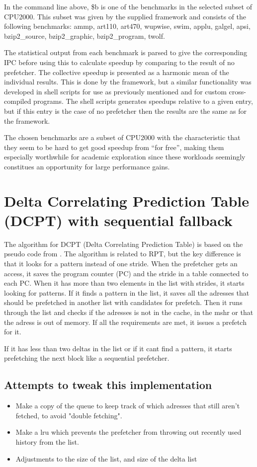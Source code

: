 \documentclass[12pt,journal,compsoc]{IEEEtran}
\begin{document}
In the command line above, \${b} is one of the benchmarks in the selected
subset of CPU2000. This subset was given by the supplied framework and consists
of the following benchmarks: ammp, art110, art470, wupwise, swim, applu,
galgel, apsi, bzip2\_source, bzip2\_graphic, bzip2\_program, twolf.

The statistical output from each benchmark is parsed to give the corresponding
IPC before using this to calculate speedup by comparing to the result
of no prefetcher. The collective speedup is presented as a harmonic mean of
the individual results. This is done by the framework, but a similar
functionality was developed in shell scripts for use as previously mentioned
and for custom cross-compiled programs. The shell scripts generates
speedups relative to a given entry, but if this entry is the case of no
prefetcher then the results are the same as for the framework.

The chosen benchmarks are a subset of CPU2000 with the characteristic that
they seem to be hard to get good speedup from ``for free'', making
them especially worthwhile for academic exploration since these workloads
seemingly constitues an opportunity for large performance gains.

\section{Delta Correlating Prediction Table (DCPT) with sequential fallback}
The algorithm for DCPT (Delta Correlating Prediction Table) is based on the pseudo code from \cite{dcptpaper}.
The algorithm is related to RPT, but the key difference is that it looks for a pattern instead of one stride.
When the prefetcher gets an access, it saves the program counter (PC) and the stride in a table connected to each PC. When it has more than two elements in the list with strides, it starts looking for patterns.
If it finds a pattern in the list, it saves all the adresses that should be prefetched in another list with candidates for prefetch.
Then it runs through the list and checks if the adresses is not in the cache, in the mshr or that the adress is out of memory. If all the requirements are met, it issues a prefetch for it.

If it has less than two deltas in the list or if it cant find a pattern, it starts prefetching the next block like a sequential prefetcher.

\subsection{Attempts to tweak this implementation}
\begin{itemize}
\item Make a copy of the queue to keep track of which adresses that still aren't fetched, to avoid "double fetching".
\item Make a lru which prevents the prefetcher from throwing out recently used history from the list.
\item Adjustments to the size of the list, and size of the delta list
\end{itemize}
\end{document}
